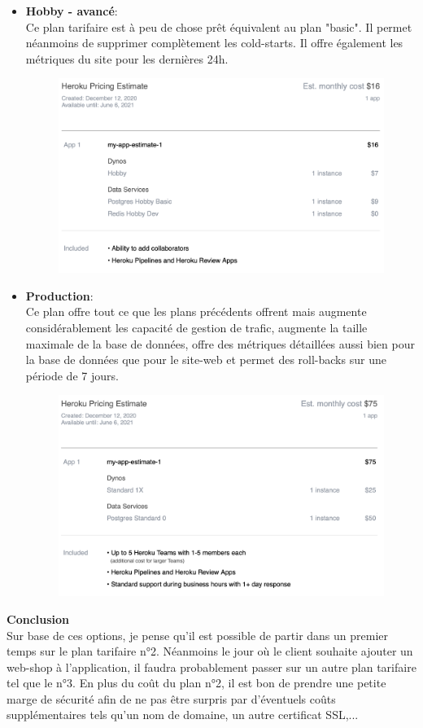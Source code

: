 \begin{itemize}
  \newpage
  \item \textbf{Hobby - avancé}: \\ Ce plan tarifaire est à peu de chose prêt équivalent au plan "basic". Il permet néanmoins de supprimer complètement les cold-starts. Il offre également les métriques du site pour les dernières 24h.
  \begin{figure}[H]
    \centering
    \includegraphics[width=0.75\linewidth]{img/heroku/Heroku_hobby.png}
  \end{figure}
  
  \item \textbf{Production}: \\ Ce plan offre tout ce que les plans précédents offrent mais augmente considérablement les capacité de gestion de trafic, augmente la taille maximale de la base de données, offre des métriques détaillées aussi bien pour la base de données que pour le site-web et permet des roll-backs sur une période de 7 jours.
  \begin{figure}[H]
    \centering
    \includegraphics[width=0.75\linewidth]{img/heroku/Heroku_prod.png}
  \end{figure}
\end{itemize}

\newpage
\textbf{Conclusion} \\ Sur base de ces options, je pense qu'il est possible de partir dans un premier temps sur le plan tarifaire n°2. Néanmoins le jour où le client souhaite ajouter un web-shop à l'application, il faudra probablement passer sur un autre plan tarifaire tel que le n°3.
\newpara
En plus du coût du plan n°2, il est bon de prendre une petite marge de sécurité afin de ne pas être surpris par d'éventuels coûts supplémentaires tels qu'un nom de domaine, un autre certificat SSL,...

